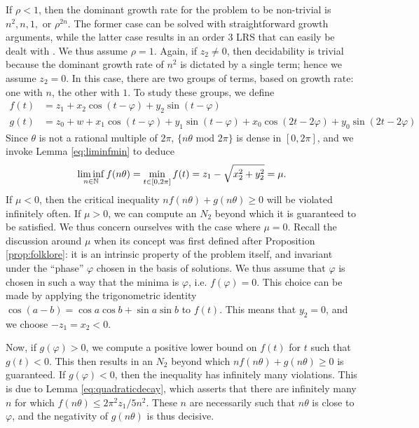 If $\rho < 1$, then the dominant growth rate for the problem to be non-trivial is $n^2, n, 1, $ or $\rho^{2n}$. The former case can be solved with straightforward growth arguments, while the latter case results in an order 3 LRS that can easily be dealt with \cite{ouaknine2014positivity,joeljames3}. We thus assume $\rho = 1$. Again, if $z_2 \ne 0$, then decidability is trivial because the dominant growth rate of $n^2$ is dictated by a single term; hence we assume $z_2 = 0$. In this case, there are two groups of terms, based on growth rate: one with $n$, the other with $1$. To study these groups, we define
\begin{align}
f(t) &= z_1 + x_2 \cos(t -\varphi) + y_2\sin(t - \varphi) \\
g(t) &= z_0 + w + x_1\cos(t - \varphi) + y_1\sin(t - \varphi) + x_0 \cos(2t - 2\varphi) + y_0\sin(2t-2\varphi)
\end{align}
Since $\theta$ is not a rational multiple of $2\pi$, $\{n\theta \text{ mod } 2\pi\}$ is dense in $[0, 2\pi]$, and we invoke Lemma \ref{eq:liminfmin} to deduce
\begin{equation}
\liminf_{n\in \mathbb{N}} f(n\theta) = \min_{t \in [0, 2\pi]} f(t) = z_1 -\sqrt{x_2^2 + y_2^2} = \mu.
\end{equation}
If $\mu < 0$, then the critical inequality $nf(n\theta) + g(n\theta) \ge 0$ will be violated infinitely often. If $\mu > 0$, we can compute an $N_2$ beyond which it is guaranteed to be satisfied. We thus concern ourselves with the case where $\mu = 0$. Recall the discussion around $\mu$ when its concept was first defined after Proposition \ref{prop:folklore}: it is an intrinsic property of the problem itself, and invariant under the ``phase'' $\varphi$ chosen in the basis of solutions. We thus assume that $\varphi$ is chosen in such a way that the minima is $\varphi$, i.e. $f(\varphi) = 0$. This choice can be made by applying the trigonometric identity $\cos(a - b) = \cos a \cos b + \sin a \sin b$ to $f(t)$. This means that $y_2 = 0$, and we choose $-z_1 = x_2 < 0$.

Now, if $g(\varphi) > 0$, we compute a positive lower bound on $f(t)$ for $t$ such that $g(t) < 0$. This then results in an $N_2$ beyond which $nf(n\theta) + g(n\theta) \ge 0$ is guaranteed. If $g(\varphi) < 0$, then the inequality has infinitely many violations. This is due to Lemma \ref{eq:quadraticdecay}, which asserts that there are infinitely many $n$ for which $f(n\theta) \le 2\pi^2z_1/5n^2$. These $n$ are necessarily such that $n\theta$ is close to $\varphi$, and the negativity of $g(n\theta)$ is thus decisive.

